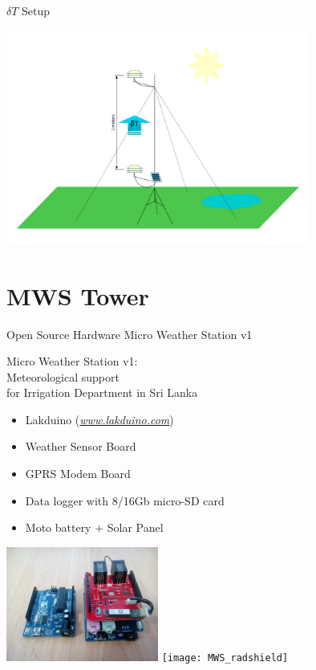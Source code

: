 \documentclass[xcolor=dvipsnames,beamer]{beamer} %
\begin{document}
\begin{frame}[fragile]{ $\delta T$ Setup}

\begin{center}
 \includegraphics[width=10cm]{MWS_v1_deltaT_sketch_cold}
\end{center}

\end{frame}

\section{ MWS Tower}
\begin{frame}[fragile]{Open Source Hardware Micro Weather Station v1}

Micro Weather Station v1:\\
Meteorological support \\
for Irrigation Department in Sri Lanka
\vspace{5mm}
\begin{itemize}
 \item Lakduino (\href{www.lakduino.com}{\textit{www.lakduino.com}})
 \item Weather Sensor Board
 \item GPRS Modem Board
 \item Data logger with 8/16Gb micro-SD card
 \item Moto battery + Solar Panel
\end{itemize}
\begin{flushright}
  \includegraphics[width=5cm]{MWSv1}
  \hspace{5mm}
  \texttt{[image: MWS\_radshield]}
\end{flushright}
\end{frame}
\end{document}
